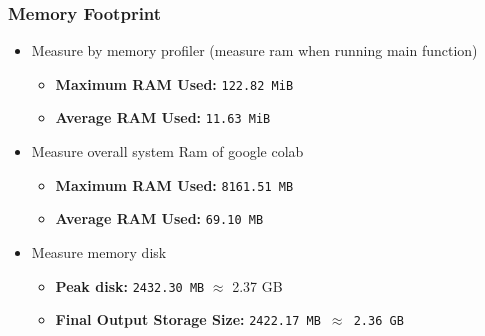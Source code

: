 \documentclass[12pt]{article}
\begin{document}


\subsubsection{Memory Footprint}
\begin{itemize}
\item Measure by memory profiler (measure ram when running main function) 
\begin{itemize}
    \item \textbf{Maximum RAM Used:} \texttt{122.82 MiB}
    \item \textbf{Average RAM Used:} \texttt{11.63 MiB}
\end{itemize}

\item Measure overall system Ram of google colab
\begin{itemize}
    \item \textbf{Maximum RAM Used:} \texttt{8161.51 MB}
    \item \textbf{Average RAM Used:} \texttt{69.10 MB}
\end{itemize}

\item Measure memory disk
\begin{itemize}
    \item \textbf{Peak disk:} \texttt{2432.30 MB} $\approx$ 2.37 GB
    \item \textbf{Final Output Storage Size:} \texttt{2422.17 MB $\approx$ 2.36 GB}
\end{itemize}

\end{itemize}






\end{document}

